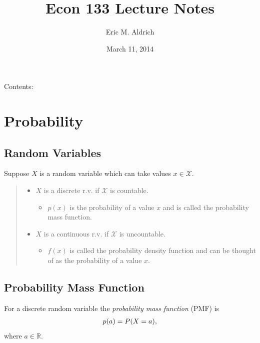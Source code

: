 \documentclass[letterpaper,10pt,english]{sphinxmanual}
\title{Econ 133 Lecture Notes}
\date{March 11, 2014}
\author{Eric M. Aldrich}
\begin{document}
\maketitle
\tableofcontents
{}\label{index::doc}


Contents:


\chapter{Probability}
\label{probability:econ-133}\label{probability::doc}\label{probability:probability}

\section{Random Variables}
\label{probability:random-variables}
Suppose $X$ is a random variable which can take values $x
\in \mathcal{X}$.
\begin{quote}
\begin{itemize}
\item {} 
$X$ is a discrete r.v. if $\mathcal{X}$ is countable.
\begin{itemize}
\item {} 
$p(x)$ is the probability of a value $x$ and is
called the probability mass function.

\end{itemize}

\end{itemize}
\begin{itemize}
\item {} 
$X$ is a continuous r.v. if $\mathcal{X}$ is
uncountable.
\begin{itemize}
\item {} 
$f(x)$ is called the probability density function and can
be thought of as the probability of a value $x$.

\end{itemize}

\end{itemize}
\end{quote}


\section{Probability Mass Function}
\label{probability:probability-mass-function}
For a discrete random variable the \emph{probability mass function} (PMF)
is
\begin{gather}
\begin{split}p(a) = P(X = a),\end{split}\notag
\end{gather}
where $a \in \mathbb{R}$.
\end{document}
